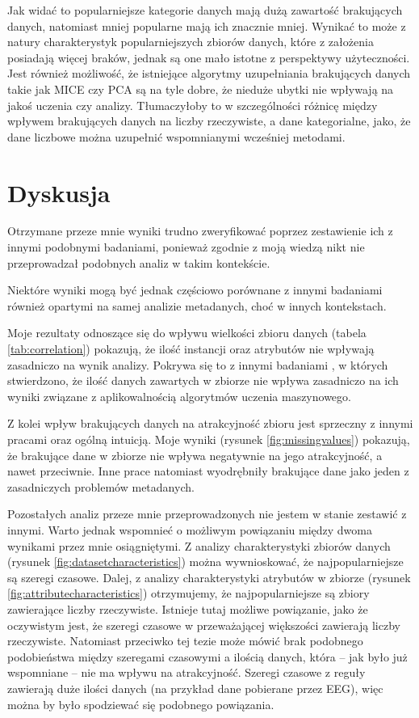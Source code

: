 Jak widać to popularniejsze kategorie danych mają dużą zawartość brakujących danych, natomiast mniej popularne mają ich znacznie mniej.
Wynikać to może z natury charakterystyk popularniejszych zbiorów danych, które z założenia posiadają więcej braków, jednak są one mało istotne z perspektywy użyteczności.
Jest również możliwość, że istniejące algorytmy uzupełniania brakujących danych takie jak MICE czy PCA są na tyle dobre, że nieduże ubytki nie wpływają na jakoś uczenia czy analizy.
Tłumaczyłoby to w szczególności różnicę między wpływem brakujących danych na liczby rzeczywiste, a dane kategorialne, jako, że dane liczbowe można uzupełnić wspomnianymi wcześniej metodami.

\section{Dyskusja}

Otrzymane przeze mnie wyniki trudno zweryfikować poprzez zestawienie ich z innymi podobnymi badaniami, ponieważ zgodnie z moją wiedzą nikt nie przeprowadzał podobnych analiz w takim kontekście.

Niektóre wyniki mogą być jednak częściowo porównane z innymi badaniami również opartymi na samej analizie metadanych, choć w innych kontekstach.

Moje rezultaty odnoszące się do wpływu wielkości zbioru danych (tabela \ref{tab:correlation}) pokazują, że ilość instancji oraz atrybutów nie wpływają zasadniczo na wynik analizy.
Pokrywa się to z innymi badaniami \cite{brazdil1994characterizing}, w których stwierdzono, że ilość danych zawartych w zbiorze nie wpływa zasadniczo na ich wyniki związane z aplikowalnością algorytmów uczenia maszynowego.

Z kolei wpływ brakujących danych na atrakcyjność zbioru jest sprzeczny z innymi pracami oraz ogólną intuicją.
Moje wyniki (rysunek \ref{fig:missingvalues}) pokazują, że brakujące dane w zbiorze nie wpływa negatywnie na jego atrakcyjność, a nawet przeciwnie.
Inne prace \cite{yasser2011analysis} natomiast wyodrębniły brakujące dane jako jeden z zasadniczych problemów metadanych.

Pozostałych analiz przeze mnie przeprowadzonych nie jestem w stanie zestawić z innymi.
Warto jednak wspomnieć o możliwym powiązaniu między dwoma wynikami przez mnie osiągniętymi.
Z analizy charakterystyki zbiorów danych (rysunek \ref{fig:datasetcharacteristics}) można wywnioskować, że najpopularniejsze są szeregi czasowe.
Dalej, z analizy charakterystyki atrybutów w zbiorze (rysunek \ref{fig:attributecharacteristics}) otrzymujemy, że najpopularniejsze są zbiory zawierające liczby rzeczywiste.
Istnieje tutaj możliwe powiązanie, jako że oczywistym jest, że szeregi czasowe w przeważającej większości zawierają liczby rzeczywiste.
Natomiast przeciwko tej tezie może mówić brak podobnego podobieństwa między szeregami czasowymi a ilością danych, która -- jak było już wspomniane -- nie ma wpływu na atrakcyjność.
Szeregi czasowe z reguły zawierają duże ilości danych (na przykład dane pobierane przez EEG), więc można by było spodziewać się podobnego powiązania.

